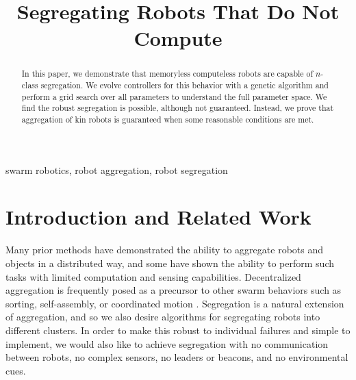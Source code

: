 \documentclass[conference]{IEEEtran}
\begin{document}
\title{Segregating Robots That Do Not Compute}

\author{
\and
{}
\and
{}
}

\maketitle

\begin{abstract}
  In this paper, we demonstrate that memoryless computeless robots are capable of $n$-class segregation. We evolve controllers for this behavior with a genetic algorithm and perform a grid search over all parameters to understand the full parameter space. We find the robust segregation is possible, although not guaranteed. Instead, we prove that aggregation of kin robots is guaranteed when some reasonable conditions are met.
\end{abstract}

\begin{IEEEkeywords}
  swarm robotics, robot aggregation, robot segregation
\end{IEEEkeywords}

\section{Introduction and Related Work}

  Many prior methods have demonstrated the ability to aggregate robots and objects in a distributed way, and some have shown the ability to perform such tasks with limited computation and sensing capabilities. Decentralized aggregation is frequently posed as a precursor to other swarm behaviors such as sorting, self-assembly, or coordinated motion \cite{gauci_evolving_2014} \cite{dorigo_evolving_2004}. Segregation is a natural extension of aggregation, and so we also desire algorithms for segregating robots into different clusters. In order to make this robust to individual failures and simple to implement, we would also like to achieve segregation with no communication between robots, no complex sensors, no leaders or beacons, and no environmental cues.
\end{document}
